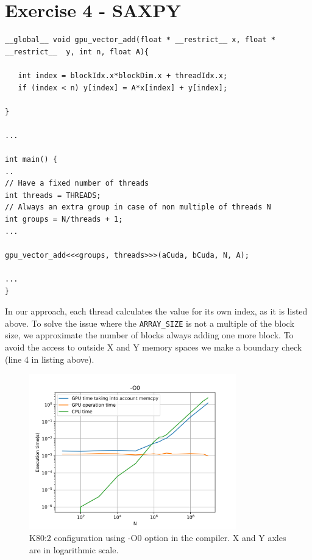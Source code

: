 \documentclass[12pt]{article}
\begin{document}
\section{Exercise 4 - SAXPY}


\begin{lstlisting}[style=CStyle]
  __global__ void gpu_vector_add(float * __restrict__ x, float * __restrict__  y, int n, float A){
    
   int index = blockIdx.x*blockDim.x + threadIdx.x;
   if (index < n) y[index] = A*x[index] + y[index];
        
} 

...

int main() {
..
// Have a fixed number of threads
int threads = THREADS;
// Always an extra group in case of non multiple of threads N
int groups = N/threads + 1; 
...

gpu_vector_add<<<groups, threads>>>(aCuda, bCuda, N, A); 

...
}

\end{lstlisting}


In our approach, each thread calculates the value for its own index, as it is listed above. To solve the issue where the \texttt{ARRAY\_SIZE} is not a multiple of the block size, we approximate the number of blocks always adding one more block. To avoid the access to outside X and Y  memory spaces we make a boundary check (line 4 in listing above).

\begin{figure}[H]
\centering
\includegraphics[width=0.8\textwidth]{O0.png}
\caption{K80:2 configuration using -O0 option in the compiler. X and Y axles are in logarithmic scale.}
\label{fig:O0}
\end{figure}
\end{document}

